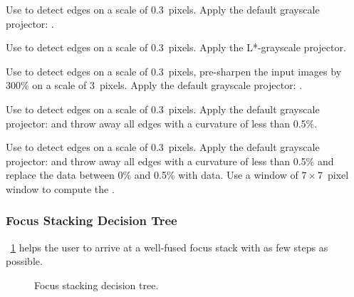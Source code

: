 \begin{codelist}
\item[\option{--contrast-edge-scale=0.3}]\itemend
  Use  to detect edges on a scale of 0.3~pixels.  Apply the default grayscale
  projector: .

\item[\itempar{\option{--contrast-edge-scale=0.3} \option{--gray-projector=l-star}}]\itemend
  Use  to detect edges on a scale of 0.3~pixels.  Apply the L*-grayscale projector.

\item[\option{--contrast-edge-scale=0.3:3:300\%}]\itemend
  Use  to detect edges on a scale of 0.3~pixels, pre-sharpen the input images by
  300\% on a scale of 3~pixels.  Apply the default grayscale projector: .

\item[\itempar{\option{--contrast-edge-scale=0.3}
    \mbox{\option{--contrast-min-curvature=-0.5\%}}}]\itemend
  Use  to detect edges on a scale of 0.3~pixels.  Apply the default grayscale
  projector:  and throw away all edges with a curvature of less than 0.5\%.

\item[\itempar{\mbox{\option{--contrast-edge-scale=0.3}}
    \mbox{\option{--contrast-min-curvature=0.5\%}}
    \mbox{\option{--contrast-window-size=7}}}]\itemend
  Use  to detect edges on a scale of 0.3~pixels.  Apply the default grayscale
  projector:  and throw away all edges with a curvature of less than 0.5\% and
  replace the  data between 0\% and 0.5\% with  data.  Use a window
  of $7 \times 7$~pixel window to compute the .
\end{codelist}


\subsubsection[Focus Stacking Decision Tree]{%
  \label{sec:focus-stacking-decision-tree}%
  Focus Stacking Decision Tree}

\figureName~\ref{fig:focus-stacking-decision-tree} helps the user to arrive at a well-fused
focus stack with as few steps as possible.

\begin{figure}
  \begin{maxipage}
    \centering
  \end{maxipage}

  \caption[Focus stacking decision tree.]{\label{fig:focus-stacking-decision-tree}%
    Focus stacking decision tree.}
\end{figure}

